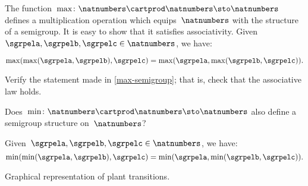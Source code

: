 \begin{example}
	\label{max-semigroup}

	The function~$\max \colon \natnumbers \cartprod \natnumbers \sto \natnumbers$ defines a multiplication operation which equips~$\natnumbers$ with the structure of a semigroup.
	It is easy to show that it satisfies associativity.
	Given~$\sgrpela,\sgrpelb,\sgrpelc\in \natnumbers$, we have:

	\begin{equation*}
		\label{eq:max-assoc}
		\max(\max(\sgrpela,\sgrpelb),\sgrpelc)
		=
		\max(\sgrpela,\max(\sgrpelb,\sgrpelc)).
	\end{equation*}
\end{example}

\begin{exercise}
	\label{ex:max-semigroup}
	Verify the statement made in \cref{max-semigroup}; that is, check that the associative law holds.

	Does~$\min \colon \natnumbers \cartprod \natnumbers \sto \natnumbers$ also define a semigroup structure on~$\natnumbers$?
\end{exercise}
\begin{solution}
	Given~$\sgrpela,\sgrpelb,\sgrpelc\in \natnumbers$, we have:
	\begin{equation*}
		\label{eq:min-assoc}
		\min(\min(\sgrpela,\sgrpelb),\sgrpelc)=\min(\sgrpela,\min(\sgrpelb,\sgrpelc)).
	\end{equation*}
\end{solution}

\begin{marginfigure}
	\caption{Graphical representation of plant transitions.}
	\label{fig:plants_transitions}
\end{marginfigure}

